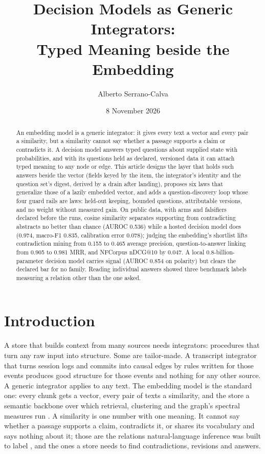 \documentclass[11pt]{article}
\title{Decision Models as Generic Integrators:\\ Typed Meaning beside the Embedding}
\author{Alberto Serrano-Calva}
\date{8 November 2026}
\theoremstyle{definition}
\theoremstyle{plain}
\theoremstyle{remark}
\begin{document}
\maketitle

\begin{abstract}
An embedding model is a generic integrator: it gives every text a vector and every pair a
similarity, but a similarity cannot say whether a passage supports a claim or contradicts it. A
decision model answers typed questions about supplied state with probabilities, and with its
questions held as declared, versioned data it can attach typed meaning to any node or edge. This
article designs the layer that holds such answers beside the vector (fields keyed by the item, the
integrator's identity and the question set's digest, derived by a drain after landing), proposes
six laws that generalize those of a lazily embedded vector, and adds a question-discovery loop
whose four guard rails are laws: held-out keeping, bounded questions, attributable versions, and
no weight without measured gain. On public data, with arms and falsifiers declared before the runs,
cosine similarity separates supporting from contradicting abstracts no better than chance (AUROC
0.536) while a hosted decision model does (0.974, macro-F1 0.835, calibration error 0.078); judging
the embedding's shortlist lifts contradiction mining from 0.155 to 0.465 average precision,
question-to-answer linking from 0.905 to 0.981 MRR, and NFCorpus nDCG@10 by 0.047. A local
0.8-billion-parameter decision model carries signal (AUROC 0.854 on polarity) but clears the
declared bar for no family. Reading individual answers showed three benchmark labels measuring a
relation other than the one asked.
\end{abstract}

\section{Introduction}
A store that builds context from many sources needs integrators: procedures that turn any raw
input into structure. Some are tailor-made. A transcript integrator that turns session logs and
commits into causal edges by rules written for those events produces good structure for those
events and nothing for any other source. A generic integrator applies to any text. The embedding
model is the standard one: every chunk gets a vector, every pair of texts a similarity, and the
store a semantic backbone over which retrieval, clustering and the graph's spectral measures run
\citep{reimers2019sbert}. A similarity is one number with one meaning. It cannot say whether a
passage supports a claim, contradicts it, or shares its vocabulary and says nothing about it; those
are the relations natural-language inference was built to label \citep{bowman2015snli}, and the
ones a store needs to find contradictions, revisions and answers.
\end{document}
